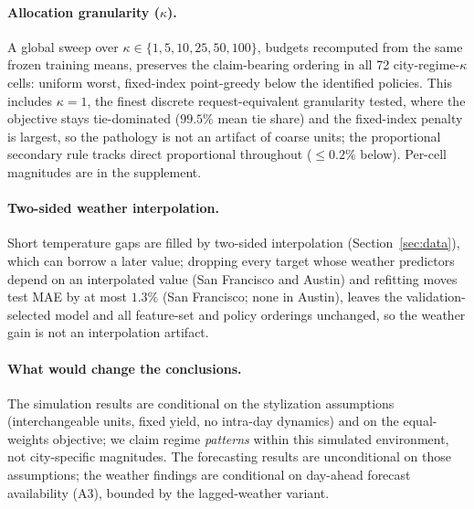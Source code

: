 \paragraph{Allocation granularity ($\kappa$).}
A global sweep over $\kappa \in \{1,5,10,25,50,100\}$, budgets recomputed
from the same frozen training means, preserves the claim-bearing ordering
in all 72 city-regime-$\kappa$ cells: uniform worst, fixed-index
point-greedy below the identified policies. This includes $\kappa=1$, the
finest discrete request-equivalent granularity tested, where the
objective stays tie-dominated ($99.5\%$ mean tie share) and the
fixed-index penalty is largest, so the pathology is not an artifact of
coarse units; the proportional secondary rule tracks direct proportional
throughout ($\le 0.2\%$ below). Per-cell magnitudes are in the supplement.

\paragraph{Two-sided weather interpolation.}
Short temperature gaps are filled by two-sided interpolation
(Section~\ref{sec:data}), which can borrow a later value; dropping every
target whose weather predictors depend on an interpolated value (San
Francisco and Austin) and refitting moves test MAE by at most $1.3\%$ (San
Francisco; none in Austin), leaves the validation-selected model and all
feature-set and policy orderings unchanged, so the weather gain is not an
interpolation artifact.

\paragraph{What would change the conclusions.} The simulation results are
conditional on the stylization assumptions (interchangeable units, fixed
yield, no intra-day dynamics) and on the equal-weights objective; we
claim regime \emph{patterns} within this simulated environment, not
city-specific magnitudes. The forecasting results are unconditional on
those assumptions; the weather findings are conditional on day-ahead
forecast availability (A3), bounded by the lagged-weather variant.

